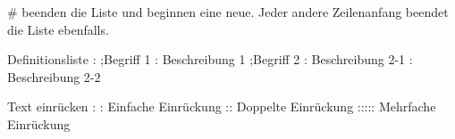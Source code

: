                     # beenden die Liste und beginnen eine neue.
                    Jeder andere Zeilenanfang beendet die Liste ebenfalls.

Definitionsliste : 
                  ;Begriff 1
                  : Beschreibung 1
                  ;Begriff 2
                  : Beschreibung 2-1
                  : Beschreibung 2-2
                  
Text einrücken : 
                  : Einfache Einrückung
                  :: Doppelte Einrückung
                  ::::: Mehrfache Einrückung
